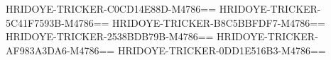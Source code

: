 HRIDOYE-TRICKER-C0CD14E88D-M4786==
HRIDOYE-TRICKER-5C41F7593B-M4786==
HRIDOYE-TRICKER-B8C5BBFDF7-M4786==
HRIDOYE-TRICKER-2538BDB79B-M4786==
HRIDOYE-TRICKER-AF983A3DA6-M4786==
HRIDOYE-TRICKER-0DD1E516B3-M4786==
